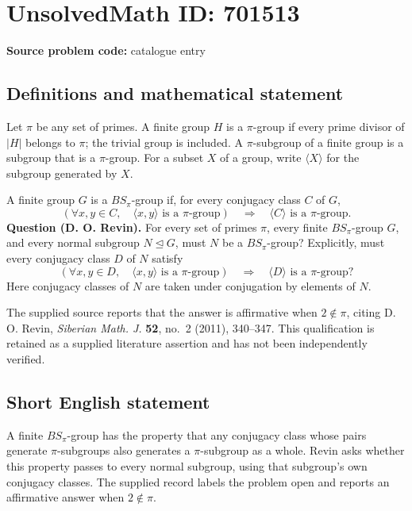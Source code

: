 \documentclass[11pt]{article}
\begin{document}
\section*{UnsolvedMath ID: 701513}
\textbf{Source problem code:} catalogue entry
\subsection{Definitions and mathematical statement}
Let \(\pi\) be any set of primes. A finite group \(H\) is a \(\pi\)-group if every prime divisor of \(|H|\) belongs to \(\pi\); the trivial group is included. A \(\pi\)-subgroup of a finite group is a subgroup that is a \(\pi\)-group. For a subset \(X\) of a group, write \(\langle X\rangle\) for the subgroup generated by \(X\).

A finite group \(G\) is a \(BS_{\pi}\)-group if, for every conjugacy class \(C\) of \(G\),
\[
\left(\forall x,y\in C,\quad \langle x,y\rangle\text{ is a }\pi\text{-group}\right)
\quad\Longrightarrow\quad
\langle C\rangle\text{ is a }\pi\text{-group}.
\]
\textbf{Question (D. O. Revin).} For every set of primes \(\pi\), every finite \(BS_{\pi}\)-group \(G\), and every normal subgroup \(N\trianglelefteq G\), must \(N\) be a \(BS_{\pi}\)-group? Explicitly, must every conjugacy class \(D\) of \(N\) satisfy
\[
\left(\forall x,y\in D,\quad \langle x,y\rangle\text{ is a }\pi\text{-group}\right)
\quad\Longrightarrow\quad
\langle D\rangle\text{ is a }\pi\text{-group}?
\]
Here conjugacy classes of \(N\) are taken under conjugation by elements of \(N\).

The supplied source reports that the answer is affirmative when \(2\notin\pi\), citing D. O. Revin, \emph{Siberian Math. J.} \textbf{52}, no.~2 (2011), 340--347. This qualification is retained as a supplied literature assertion and has not been independently verified.
\subsection{Short English statement}
A finite \(BS_{\pi}\)-group has the property that any conjugacy class whose pairs generate \(\pi\)-subgroups also generates a \(\pi\)-subgroup as a whole. Revin asks whether this property passes to every normal subgroup, using that subgroup's own conjugacy classes. The supplied record labels the problem open and reports an affirmative answer when \(2\notin\pi\).
\end{document}
